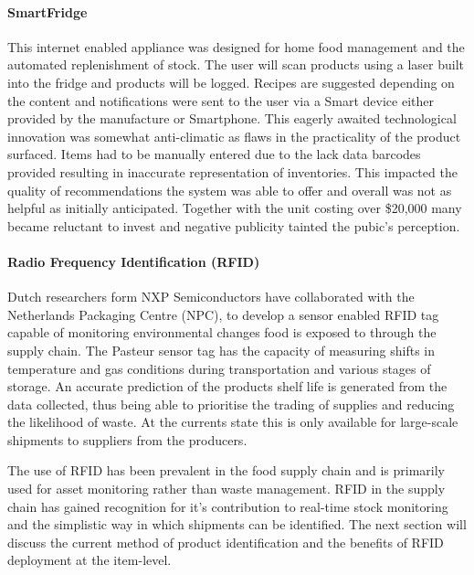 \documentclass[a4paper, 11pt]{article}
\begin{document}
\paragraph{SmartFridge}
This internet enabled appliance was designed for home food management and the automated replenishment of stock. The user will scan products using a laser built into the fridge and products will be logged. Recipes are suggested depending on the content and notifications were sent to the user via a Smart device either provided by the manufacture or Smartphone. This eagerly awaited technological innovation was somewhat anti-climatic as flaws in the practicality of the product surfaced. Items had to be manually entered due to the lack data barcodes provided resulting in inaccurate representation of inventories. This impacted the quality of recommendations the system was able to offer and overall was not as helpful as initially anticipated. Together with the unit costing over \$20,000 many became reluctant to invest and negative publicity tainted the pubic's perception.\cite{idiotFridge}

\paragraph{Radio Frequency Identification (RFID)}
Dutch researchers form NXP Semiconductors have collaborated with the Netherlands Packaging Centre (NPC),  to develop a sensor enabled RFID tag capable of monitoring environmental changes food is exposed to through the supply chain.\cite{rfidFood} The Pasteur sensor tag has the capacity of measuring shifts in temperature and gas conditions during transportation and various stages of storage. An accurate prediction of the products shelf life is generated from the data collected, thus being able to prioritise the trading of supplies and reducing the likelihood of waste. At the currents state this is only available for large-scale shipments to suppliers from the producers.

The use of RFID has been prevalent in the food supply chain and is primarily used for asset monitoring rather than waste management. RFID in the supply chain has gained recognition for it's contribution to real-time stock monitoring and the simplistic way in which shipments can be identified.\cite{RFID} The next section will discuss the current method of product identification and the benefits of RFID deployment at the item-level.


\vspace{\baselineskip}
\vspace{\baselineskip}
\vspace{\baselineskip}
\end{document}
